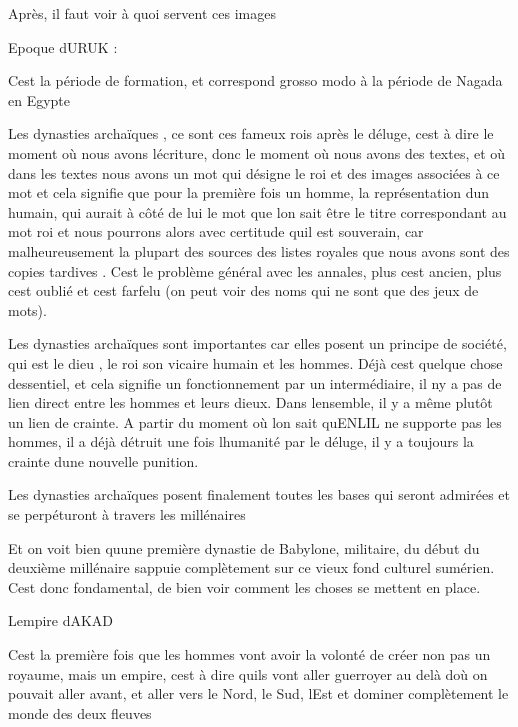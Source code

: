 \documentclass{article}
\begin{document}
Après, il faut voir à quoi servent ces images

Epoque d{\textquotesingle}URUK : 

C{\textquotesingle}est la période de formation, et correspond grosso
modo à la période de Nagada en Egypte

Les dynasties archaïques , ce sont ces fameux rois après le déluge,
c{\textquotesingle}est à dire le moment où nous avons
l{\textquotesingle}écriture, donc le moment où nous avons des textes,
et où dans les textes nous avons un mot qui désigne le roi et des
images associées à ce mot et cela signifie que pour la première fois un
homme, la représentation d{\textquotesingle}un humain, qui aurait à
côté de lui le mot que l{\textquotesingle}on sait être le titre
correspondant au mot roi et nous  pourrons alors avec certitude
qu{\textquotesingle}il est souverain, car malheureusement la plupart
des sources des listes royales que nous avons sont des copies tardives
. C{\textquotesingle}est le problème général avec les annales, plus
c{\textquotesingle}est ancien, plus c{\textquotesingle}est oublié et
c{\textquotesingle}est farfelu (on peut voir des noms qui ne sont que
des jeux de mots).

Les dynasties archaïques sont importantes car elles posent un principe
de société, qui est le dieu , le roi son vicaire humain et les hommes.
Déjà c{\textquotesingle}est quelque chose d{\textquotesingle}essentiel,
et cela signifie un fonctionnement par un intermédiaire, il
n{\textquotesingle}y a pas de lien direct entre les hommes et leurs
dieux.  Dans l{\textquotesingle}ensemble, il y a même plutôt un lien de
crainte. A partir du moment où  l{\textquotesingle}on sait
qu{\textquotesingle}ENLIL ne supporte pas les hommes, il a déjà détruit
une fois l{\textquotesingle}humanité par le déluge, il y a toujours la
crainte d{\textquotesingle}une nouvelle punition.

Les dynasties archaïques posent finalement toutes les bases qui seront
admirées et se perpéturont à travers les millénaires

Et on voit bien qu{\textquotesingle}une première dynastie de Babylone,
militaire, du début du deuxième millénaire s{\textquotesingle}appuie
complètement sur ce vieux fond culturel sumérien.
C{\textquotesingle}est donc fondamental, de bien voir comment les
choses se mettent en place.

L{\textquotesingle}empire d{\textquotesingle}AKAD 

C{\textquotesingle}est  la première fois que les hommes vont avoir la
volonté de créer non pas un royaume, mais un empire,
c{\textquotesingle}est à dire qu{\textquotesingle}ils vont aller
guerroyer au delà d{\textquotesingle}où on pouvait aller avant, et
aller vers le Nord, le Sud, l{\textquotesingle}Est et dominer
complètement le  monde des deux fleuves
\end{document}
